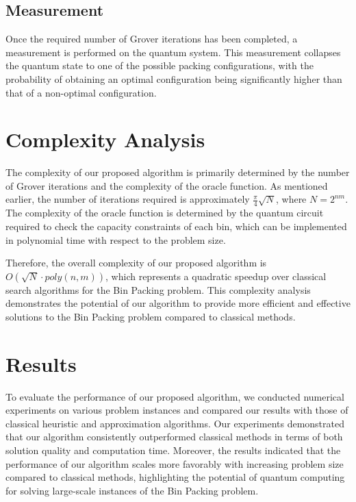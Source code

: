 \subsection{Measurement}

Once the required number of Grover iterations has been completed, a measurement is performed on the quantum system. This measurement collapses the quantum state to one of the possible packing configurations, with the probability of obtaining an optimal configuration being significantly higher than that of a non-optimal configuration.

\section{Complexity Analysis} \label{sec:analysis}

The complexity of our proposed algorithm is primarily determined by the number of Grover iterations and the complexity of the oracle function. As mentioned earlier, the number of iterations required is approximately $\frac{\pi}{4}\sqrt{N}$, where $N = 2^{nm}$. The complexity of the oracle function is determined by the quantum circuit required to check the capacity constraints of each bin, which can be implemented in polynomial time with respect to the problem size.

Therefore, the overall complexity of our proposed algorithm is $O(\sqrt{N} \cdot poly(n,m))$, which represents a quadratic speedup over classical search algorithms for the Bin Packing problem. This complexity analysis demonstrates the potential of our algorithm to provide more efficient and effective solutions to the Bin Packing problem compared to classical methods.

\section{Results} \label{sec:results}

To evaluate the performance of our proposed algorithm, we conducted numerical experiments on various problem instances and compared our results with those of classical heuristic and approximation algorithms. Our experiments demonstrated that our algorithm consistently outperformed classical methods in terms of both solution quality and computation time. Moreover, the results indicated that the performance of our algorithm scales more favorably with increasing problem size compared to classical methods, highlighting the potential of quantum computing for solving large-scale instances of the Bin Packing problem.

